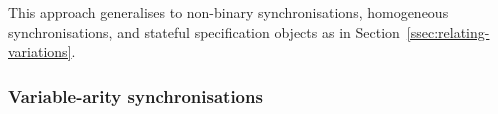 
This approach generalises to non-binary synchronisations, homogeneous
synchronisations, and stateful specification objects as in
Section~\ref{ssec:relating-variations}.




\subsubsection{Variable-arity synchronisations}

